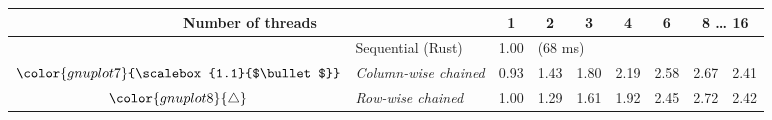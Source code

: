 \begin{tabular}{clrrrrrrr}
\toprule
\multicolumn{2}{c}{\textbf{Number of threads}} & \multicolumn{1}{c}{\textbf{ 1 }} & \multicolumn{1}{c}{\textbf{ 2 }} & \multicolumn{1}{c}{\textbf{ 3 }} & \multicolumn{1}{c}{\textbf{ 4 }} & \multicolumn{1}{c}{\textbf{ 6 }} & \multicolumn{2}{c}{\textbf{ 8 } \dots \textbf{ 16 }} \\
\midrule
& Sequential (Rust) & \multicolumn{1}{r}{ 1.00 } & \multicolumn{ 6 }{l}{(68 ms)} \\
\rowcolor{gnuplot7!30}$\color{gnuplot7}{\scalebox{1.1}{$\bullet$}}$ & \textit{Column-wise chained} & \cellcolor{gnuplot7!30} 0.93 & \cellcolor{gnuplot7!30} 1.43 & \cellcolor{gnuplot7!30} 1.80 & \cellcolor{gnuplot7!30} 2.19 & \cellcolor{gnuplot7!30} 2.58 & \cellcolor{gnuplot7!30} 2.67 & \cellcolor{gnuplot7!30} 2.41 \\
\rowcolor{gnuplot8!30}$\color{gnuplot8}{\triangle}$ & \textit{Row-wise chained} & \cellcolor{gnuplot8!30} 1.00 & \cellcolor{gnuplot8!30} 1.29 & \cellcolor{gnuplot8!30} 1.61 & \cellcolor{gnuplot8!30} 1.92 & \cellcolor{gnuplot8!30} 2.45 & \cellcolor{gnuplot8!30} 2.72 & \cellcolor{gnuplot8!30} 2.42 \\
\bottomrule
\end{tabular}
